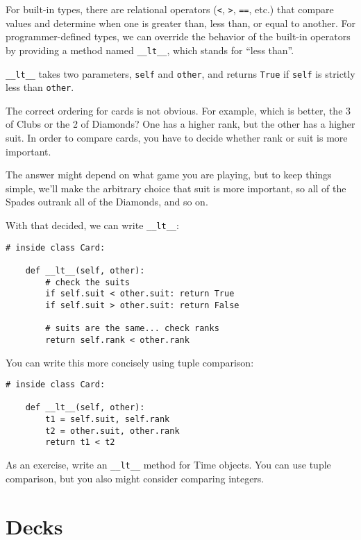 \documentclass[10pt]{book}
\begin{document}
For built-in types, there are relational operators
({\tt <}, {\tt >}, {\tt ==}, etc.)
that compare
values and determine when one is greater than, less than, or equal to
another.  For programmer-defined types, we can override the behavior of
the built-in operators by providing a method named
\verb"__lt__", which stands for ``less than''.

\verb"__lt__" takes two parameters, {\tt self} and {\tt other},
and returns {\tt True} if {\tt self} is strictly less than {\tt other}.

The correct ordering for cards is not obvious.
For example, which
is better, the 3 of Clubs or the 2 of Diamonds?  One has a higher
rank, but the other has a higher suit.  In order to compare
cards, you have to decide whether rank or suit is more important.

The answer might depend on what game you are playing, but to keep
things simple, we'll make the arbitrary choice that suit is more
important, so all of the Spades outrank all of the Diamonds,
and so on.

With that decided, we can write \verb"__lt__":

\begin{verbatim}
# inside class Card:

    def __lt__(self, other):
        # check the suits
        if self.suit < other.suit: return True
        if self.suit > other.suit: return False

        # suits are the same... check ranks
        return self.rank < other.rank
\end{verbatim}
%
You can write this more concisely using tuple comparison:

\begin{verbatim}
# inside class Card:

    def __lt__(self, other):
        t1 = self.suit, self.rank
        t2 = other.suit, other.rank
        return t1 < t2
\end{verbatim}
%
As an exercise, write an \verb"__lt__" method for Time objects.  You
can use tuple comparison, but you also might consider 
comparing integers.


\section{Decks}
\end{document}
